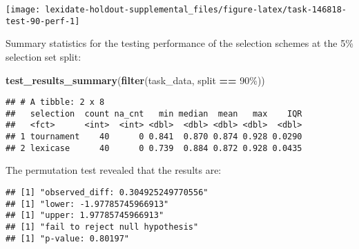 \documentclass[
]{book}
\newenvironment{Shaded}{\begin{snugshade}}{\end{snugshade}}
\newcommand{\AttributeTok}[1]{\textcolor[rgb]{0.13,0.29,0.53}{#1}}
\newcommand{\DecValTok}[1]{\textcolor[rgb]{0.00,0.00,0.81}{#1}}
\newcommand{\FunctionTok}[1]{\textcolor[rgb]{0.13,0.29,0.53}{\textbf{#1}}}
\newcommand{\NormalTok}[1]{#1}
\newcommand{\OtherTok}[1]{\textcolor[rgb]{0.56,0.35,0.01}{#1}}
\newcommand{\SpecialCharTok}[1]{\textcolor[rgb]{0.81,0.36,0.00}{\textbf{#1}}}
\newcommand{\StringTok}[1]{\textcolor[rgb]{0.31,0.60,0.02}{#1}}
\begin{document}
\texttt{[image: lexidate-holdout-supplemental\_files/figure-latex/task-146818-test-90-perf-1]}

Summary statistics for the testing performance of the selection schemes at the 5\% selection set split:

\begin{Shaded}
\begin{Highlighting}[]
\FunctionTok{test\_results\_summary}\NormalTok{(}\FunctionTok{filter}\NormalTok{(task\_data, split }\SpecialCharTok{==} \StringTok{\textquotesingle{}90\%\textquotesingle{}}\NormalTok{))}
\end{Highlighting}
\end{Shaded}

\begin{verbatim}
## # A tibble: 2 x 8
##   selection  count na_cnt   min median  mean   max    IQR
##   <fct>      <int>  <int> <dbl>  <dbl> <dbl> <dbl>  <dbl>
## 1 tournament    40      0 0.841  0.870 0.874 0.928 0.0290
## 2 lexicase      40      0 0.739  0.884 0.872 0.928 0.0435
\end{verbatim}

The permutation test revealed that the results are:

\begin{Shaded}
\end{Shaded}

\begin{verbatim}
## [1] "observed_diff: 0.304925249770556"
## [1] "lower: -1.97785745966913"
## [1] "upper: 1.97785745966913"
## [1] "fail to reject null hypothesis"
## [1] "p-value: 0.80197"
\end{verbatim}
\end{document}
